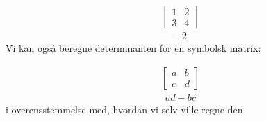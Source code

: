 \documentclass[letterpaper,10pt,english]{jupyterBook}
\begin{document}
\begin{sphinxVerbatim}[commandchars=\\\{\}]
  \PYG{p}{[}\PYG{p}{[} \PYG{p}{]} \PYG{p}{[} \PYG{p}{]}\PYG{p}{]}
\end{sphinxVerbatim}
\begin{equation*}
\begin{split}\displaystyle \left[\begin{matrix}1 & 2\\3 & 4\end{matrix}\right]\end{split}
\end{equation*}\begin{equation*}
\begin{split}\displaystyle -2\end{split}
\end{equation*}
Vi kan også beregne determinanten for en symbolsk matrix:

\begin{sphinxVerbatim}[commandchars=\\\{\}]
      

  \PYG{p}{[}\PYG{p}{[} \PYG{p}{]} \PYG{p}{[} \PYG{p}{]}\PYG{p}{]}

\end{sphinxVerbatim}
\begin{equation*}
\begin{split}\displaystyle \left[\begin{matrix}a & b\\c & d\end{matrix}\right]\end{split}
\end{equation*}\begin{equation*}
\begin{split}\displaystyle a d - b c\end{split}
\end{equation*}
i overensstemmelse med, hvordan vi selv ville regne den.
\end{document}
